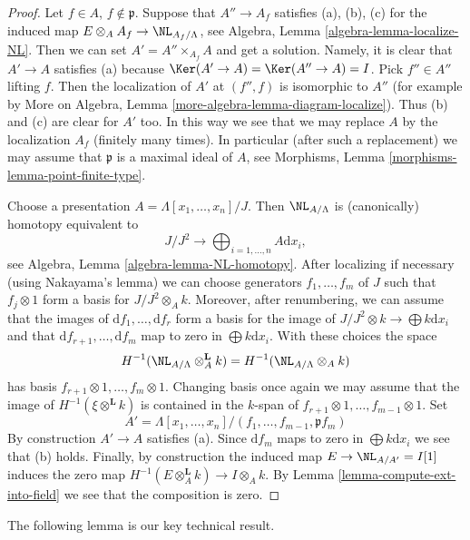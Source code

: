 \begin{proof}
Let $f \in A$, $f \not \in \mathfrak p$. Suppose that $A'' \to A_f$
satisfies (a), (b), (c) for the induced map
$E \otimes_A A_f \to \NL_{A_f/\Lambda}$, see
Algebra, Lemma \ref{algebra-lemma-localize-NL}.
Then we can set $A' = A'' \times_{A_f} A$ and get a solution.
Namely, it is clear that $A' \to A$ satisfies (a) because
$\Ker(A' \to A) = \Ker(A'' \to A) = I$. Pick
$f'' \in A''$ lifting $f$. Then the localization of $A'$ at
$(f'', f)$ is isomorphic to $A''$
(for example by
More on Algebra, Lemma \ref{more-algebra-lemma-diagram-localize}).
Thus (b) and (c) are clear for $A'$ too.
In this way we see that we may replace $A$ by the localization
$A_f$ (finitely many times).
In particular (after such a replacement) we may assume that $\mathfrak p$
is a maximal ideal of $A$, see
Morphisms, Lemma \ref{morphisms-lemma-point-finite-type}.

\medskip\noindent
Choose a presentation $A = \Lambda[x_1, \ldots, x_n]/J$. Then
$\NL_{A/\Lambda}$ is (canonically) homotopy equivalent to
$$
J/J^2
\longrightarrow
\bigoplus\nolimits_{i = 1, \ldots, n} A\text{d}x_i,
$$
see Algebra, Lemma \ref{algebra-lemma-NL-homotopy}. After localizing
if necessary (using Nakayama's lemma) we can choose generators
$f_1, \ldots, f_m$ of $J$ such that $f_j \otimes 1$ form a basis for
$J/J^2 \otimes_A k$. Moreover, after renumbering, we can assume that the
images of $\text{d}f_1, \ldots, \text{d}f_r$ form a
basis for the image of $J/J^2 \otimes k \to \bigoplus k\text{d}x_i$
and that $\text{d}f_{r + 1}, \ldots, \text{d}f_m$ map to zero in
$\bigoplus k\text{d}x_i$. With these choices the space
$$
H^{-1}(\NL_{A/\Lambda} \otimes^{\mathbf{L}}_A k) =
H^{-1}(\NL_{A/\Lambda} \otimes_A k)
$$
has basis $f_{r + 1} \otimes 1, \ldots, f_m \otimes 1$. Changing basis
once again we may assume that the image of $H^{-1}(\xi \otimes^{\mathbf{L}} k)$
is contained in the $k$-span of
$f_{r + 1} \otimes 1, \ldots, f_{m - 1} \otimes 1$.
Set
$$
A' = \Lambda[x_1, \ldots, x_n]/(f_1, \ldots, f_{m - 1}, \mathfrak pf_m)
$$
By construction $A' \to A$ satisfies (a). Since $\text{d}f_m$ maps
to zero in $\bigoplus k\text{d}x_i$ we see that (b) holds. Finally, by
construction the induced map $E \to \NL_{A/A'} = I[1]$ induces the zero map
$H^{-1}(E \otimes_A^\mathbf{L} k) \to I \otimes_A k$. By
Lemma \ref{lemma-compute-ext-into-field}
we see that the composition is zero.
\end{proof}

\noindent
The following lemma is our key technical result.

